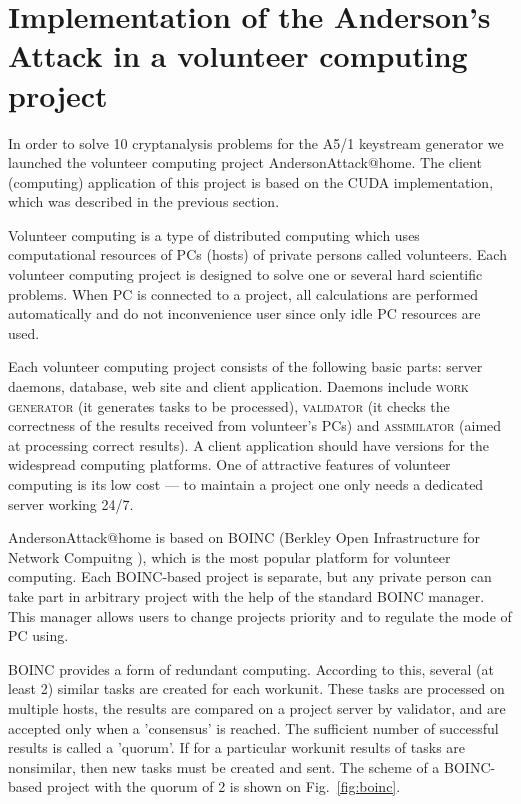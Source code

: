 \documentclass[runningheads,a4paper]{llncs}[2015/06/24]
\begin{document}
\section{Implementation of the Anderson's Attack in a volunteer computing
project}\label{sec:boinc}
In order to solve 10 cryptanalysis problems for the A5/1 keystream generator we
launched the volunteer computing project AndersonAttack@home. The client (computing)
application of this project is based on the CUDA implementation, which was
described in the previous section.

Volunteer computing \cite{DBLP:conf/ccgrid/AndersonF06} is a type of distributed computing \cite{Foster:1995:DBP:527029} which uses computational resources of PCs (hosts) of private persons called volunteers. 
Each volunteer computing project is designed to solve one or several hard scientific problems. When PC is
connected to a project, all calculations are performed automatically and
do not inconvenience user since only idle PC resources are used.

Each volunteer computing project consists of the following basic parts: server
daemons, database, web site and client application. Daemons include
\textsc{work generator} (it generates tasks to be processed), \textsc{validator}
(it checks the correctness of the results received from volunteer's PCs) and
\textsc{assimilator} (aimed at processing correct results). A client application should
have versions for the widespread computing platforms.  One of attractive
features of volunteer computing is its low cost --- to maintain a project one
only needs a dedicated server working 24/7.

AndersonAttack@home is based on BOINC (Berkley Open Infrastructure for Network
Compuitng \cite{Anderson:2004:BSP:1032646.1033223}), which is the most popular platform for
volunteer computing. Each BOINC-based project is separate, but any private
person can take part in arbitrary project with the help of the standard BOINC
manager. This manager allows users to change projects priority and to
regulate the mode of PC using. 

BOINC provides a form of redundant computing.  According to this, several (at
least 2) similar tasks are created for each workunit. These tasks are processed
on multiple hosts, the results are compared on a project server by validator,
and are accepted only when a 'consensus' is reached. The sufficient number of
successful results is called a 'quorum'. If for a particular workunit results
of tasks are nonsimilar, then new tasks must be created and sent. The scheme of
a BOINC-based project with the quorum of 2 is shown on Fig.~\ref{fig:boinc}.
\end{document}

